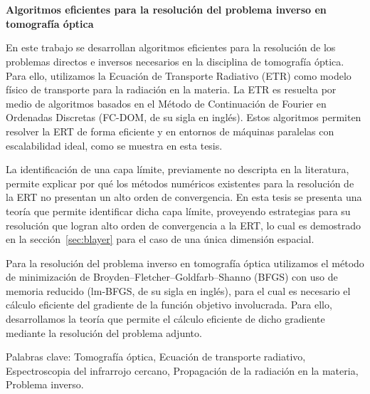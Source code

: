 \chapter*{}

\begin{center}
\begin{large}
\textbf{Algoritmos eficientes para la resolución 
del problema inverso en tomografía óptica}
\end{large}
\end{center}

\vspace{1cm}
En este trabajo se desarrollan   
algoritmos eficientes para la resolución de los problemas directos 
e inversos necesarios en la disciplina de tomografía óptica. Para ello, utilizamos la Ecuación de Transporte 
Radiativo (ETR) como modelo físico de transporte para la radiación 
en la materia. 
La ETR es resuelta por medio de algoritmos basados en el Método  
de Continuación de Fourier en Ordenadas Discretas (FC-DOM, de su sigla en inglés). Estos algoritmos 
permiten resolver la ERT de forma eficiente y en entornos de máquinas paralelas 
con escalabilidad ideal, como se muestra en esta tesis. 

La identificación de una capa límite, previamente no descripta en la literatura, 
permite explicar por qué los métodos numéricos existentes para la resolución de la ERT 
no presentan un alto orden de convergencia. En esta tesis se presenta 
una teoría que permite identificar dicha capa límite, proveyendo  
estrategias para su resolución que logran alto orden de convergencia 
a la ERT, lo cual es demostrado en la sección~\ref{sec:blayer} para el caso de una única dimensión espacial.

Para la resolución del problema inverso en tomografía óptica utilizamos el método de minimización 
de Broyden–Fletcher–Goldfarb–Shanno (BFGS) con uso de memoria reducido 
(lm-BFGS, de su sigla en inglés), 
para el cual es necesario el cálculo eficiente del gradiente 
de la función objetivo involucrada. Para ello, desarrollamos la teoría 
que permite el cálculo eficiente de dicho gradiente  
mediante la resolución del problema adjunto. 


\vspace{1cm}
\noindent
Palabras clave: 
Tomografía óptica,
Ecuación de transporte radiativo, 
Espectroscopia del infrarrojo cercano, 
Propagación de la radiación en la materia,
Problema inverso.
